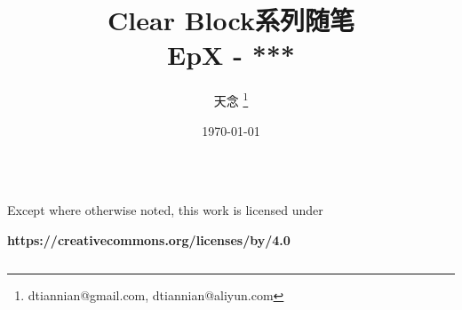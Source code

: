 \documentclass{beamer}
\title{Clear Block系列随笔 \\ EpX - ***}
\author{天念 \thanks{dtiannian@gmail.com, dtiannian@aliyun.com}}
\date{\today}
\begin{document}
\begin{frame}
    \titlepage
\end{frame}



\begin{frame}[c]
    \begin{columns}[c]
        \begin{column}[c]{5cm}
        \end{column}
        \begin{column}[c]{5cm}
        \end{column}
    \end{columns}

    \begin{columns}[c]
        \begin{column}[c]{5cm}
            \centerline{Except where otherwise noted, this work is licensed under}
            \centerline{\textbf{https://creativecommons.org/licenses/by/4.0}}
        \end{column}
    \end{columns}
\end{frame}
\end{document}
